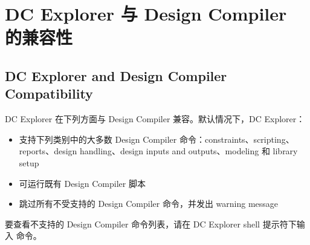 \section{DC Explorer 与 Design Compiler 的兼容性}
\subsection*{DC Explorer and Design Compiler Compatibility}

DC Explorer 在下列方面与 Design Compiler 兼容。默认情况下，DC Explorer：
\begin{itemize}
  \item 支持下列类别中的大多数 Design Compiler 命令：constraints、scripting、reports、design handling、design inputs and outputs、modeling 和 library setup
  \item 可运行既有 Design Compiler 脚本
  \item 跳过所有不受支持的 Design Compiler 命令，并发出 warning message
\end{itemize}

要查看不支持的 Design Compiler 命令列表，请在 DC Explorer shell 提示符下输入  命令。

